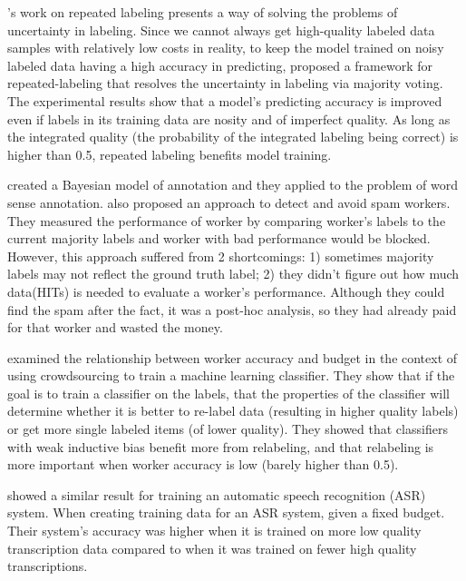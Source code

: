\documentclass[11pt,letterpaper]{article}
\begin{document}
's work on repeated labeling presents a way of solving the problems of uncertainty in labeling. Since we cannot always get high-quality labeled data samples with relatively low costs in reality, to keep the model trained on noisy labeled data having a high accuracy in predicting,  proposed a framework for repeated-labeling that resolves the uncertainty in labeling via majority voting. The experimental results show that a model's predicting accuracy is improved even if labels in its training data are nosity and of imperfect quality.  As long as the integrated quality (the probability of the integrated labeling being correct) is higher than 0.5, repeated labeling benefits model training. 

 created a Bayesian model of annotation and they applied to the problem of word sense annotation.  also proposed an approach to detect and avoid spam workers. 
They measured the performance of worker by comparing worker's labels to the current majority labels and worker with bad performance would be blocked. However, this approach suffered from 2 shortcomings: 1) sometimes majority labels may not reflect the ground truth label; 2) they didn't figure out  how much data(HITs) is needed to evaluate a worker's performance. Although they could find the spam after the fact, it was a post-hoc analysis, so they had already paid for that worker and wasted the money.

 examined the relationship between worker accuracy and budget in the context of using crowdsourcing to train a machine learning classifier.  They show that if the goal is to train a classifier on the labels, that the properties of the classifier will determine whether it is better to re-label data (resulting in higher quality labels) or get more single labeled items (of lower quality). They showed that classifiers with weak inductive bias  benefit more from relabeling, and that relabeling is more important when worker accuracy is low (barely higher than 0.5). 

 showed a similar result for training an automatic speech recognition (ASR) system.  When creating training data for an ASR system, given a fixed budget. Their system's accuracy was higher when it is trained on more low quality transcription data compared to when it was trained on fewer high quality transcriptions.
\end{document}
